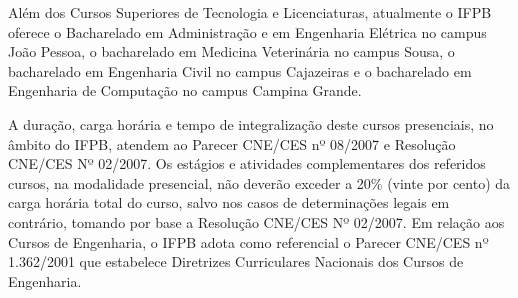 	Além dos Cursos Superiores de Tecnologia e Licenciaturas, atualmente o IFPB oferece o Bacharelado em Administração e em Engenharia Elétrica no campus João Pessoa, o bacharelado em Medicina Veterinária no campus Sousa, o bacharelado em Engenharia Civil no campus Cajazeiras e o bacharelado em Engenharia de Computação no campus Campina Grande. 
	
	A duração, carga horária e tempo de integralização deste cursos presenciais, no âmbito do IFPB, atendem ao Parecer CNE/CES nº 08/2007 e Resolução CNE/CES Nº 02/2007. Os estágios e atividades complementares dos referidos cursos, na modalidade presencial, não deverão exceder a 20\% (vinte por cento) da carga horária total do curso, salvo nos casos de determinações legais em contrário, tomando por base a Resolução CNE/CES Nº 02/2007. Em relação aos Cursos de Engenharia, o IFPB adota como referencial o Parecer CNE/CES nº 1.362/2001 que estabelece Diretrizes Curriculares Nacionais dos Cursos de Engenharia.

